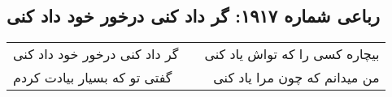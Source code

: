 \begin{center}
\section*{رباعی شماره ۱۹۱۷: گر داد کنی درخور خود داد کنی}
\label{sec:1917}
\begin{longtable}{l p{0.5cm} r}
گر داد کنی درخور خود داد کنی
&&
بیچاره کسی را که تواش یاد کنی
\\
گفتی تو که بسیار بیادت کردم
&&
من میدانم که چون مرا یاد کنی
\\
\end{longtable}
\end{center}
